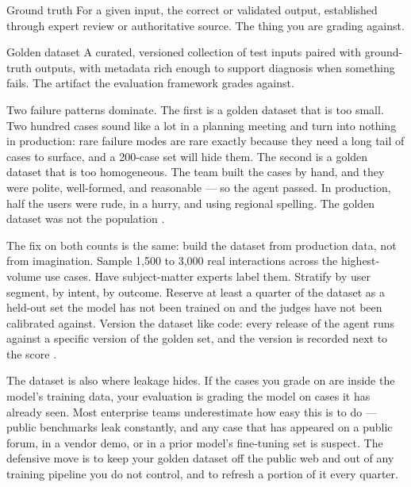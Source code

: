 \begin{TNdefinition}{Ground truth}
For a given input, the correct or validated output, established through expert review or authoritative source. The thing you are grading against.
\end{TNdefinition}

\begin{TNdefinition}{Golden dataset}
A curated, versioned collection of test inputs paired with ground-truth outputs, with metadata rich enough to support diagnosis when something fails. The artifact the evaluation framework grades against.
\end{TNdefinition}

Two failure patterns dominate. The first is a golden dataset that is too small. Two hundred cases sound like a lot in a planning meeting and turn into nothing in production: rare failure modes are rare exactly because they need a long tail of cases to surface, and a 200-case set will hide them. The second is a golden dataset that is too homogeneous. The team built the cases by hand, and they were polite, well-formed, and reasonable --- so the agent passed. In production, half the users were rude, in a hurry, and using regional spelling. The golden dataset was not the population \citep{asai2023selfrag, honovich2022true}.

The fix on both counts is the same: build the dataset from production data, not from imagination. Sample 1,500 to 3,000 real interactions across the highest-volume use cases. Have subject-matter experts label them. Stratify by user segment, by intent, by outcome. Reserve at least a quarter of the dataset as a held-out set the model has not been trained on and the judges have not been calibrated against. Version the dataset like code: every release of the agent runs against a specific version of the golden set, and the version is recorded next to the score \citep{mohammadi2025survey, yehudai2025survey}.

The dataset is also where leakage hides. If the cases you grade on are inside the model's training data, your evaluation is grading the model on cases it has already seen. Most enterprise teams underestimate how easy this is to do --- public benchmarks leak constantly, and any case that has appeared on a public forum, in a vendor demo, or in a prior model's fine-tuning set is suspect. The defensive move is to keep your golden dataset off the public web and out of any training pipeline you do not control, and to refresh a portion of it every quarter.


